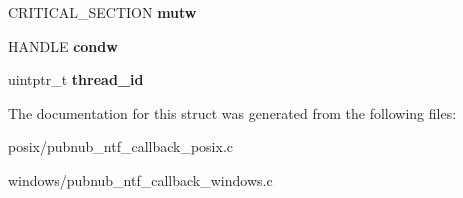 \begin{DoxyCompactItemize}
\item 
\hypertarget{structSocketWatcherData_a7b4f78017ad74470203a88ae9e01182e}{C\-R\-I\-T\-I\-C\-A\-L\-\_\-\-S\-E\-C\-T\-I\-O\-N {\bfseries mutw}}\label{structSocketWatcherData_a7b4f78017ad74470203a88ae9e01182e}

\item 
\hypertarget{structSocketWatcherData_a01a8bb7559171d88e55e1398537d6886}{H\-A\-N\-D\-L\-E {\bfseries condw}}\label{structSocketWatcherData_a01a8bb7559171d88e55e1398537d6886}

\item 
\hypertarget{structSocketWatcherData_a5f5bf222e5bc98a57aeb91f6a01ef21f}{uintptr\-\_\-t {\bfseries thread\-\_\-id}}\label{structSocketWatcherData_a5f5bf222e5bc98a57aeb91f6a01ef21f}

\end{DoxyCompactItemize}


The documentation for this struct was generated from the following files\-:\begin{DoxyCompactItemize}
\item 
posix/pubnub\-\_\-ntf\-\_\-callback\-\_\-posix.\-c\item 
windows/pubnub\-\_\-ntf\-\_\-callback\-\_\-windows.\-c\end{DoxyCompactItemize}
